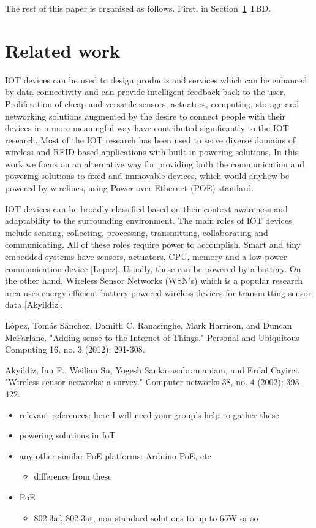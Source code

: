 \documentclass[draft,a4paper]{siamltex}
\begin{document}
The rest of this paper is organised as follows.  First, in
Section~\ref{sec:related} TBD.
 

\section{Related work}
\label{sec:related}

IOT devices can be used to design products and services which can be enhanced by
data connectivity and can provide intelligent feedback back to the user.
Proliferation of cheap and versatile sensors, actuators, computing, storage and
networking solutions augmented by the desire to connect people with their
devices in a more meaningful way have contributed significantly to the IOT
research. Most of the IOT research has been used to serve diverse domains of
wireless and RFID based applications with built-in powering solutions. In this
work we focus on an alternative way for providing both the communication and
powering solutions to fixed and immovable devices, which would anyhow be powered
by wirelines, using Power over Ethernet (POE) standard.

IOT devices can be broadly classified based on their context awareness and
adaptability to the surrounding environment. The main roles of IOT devices
include sensing, collecting, processing, transmitting, collaborating and
communicating. All of these roles require power to accomplish. Smart and tiny
embedded systems have sensors, actuators, CPU, memory and a low-power
communication device [Lopez]. Usually, these can be powered by a battery. On the
other hand, Wireless Sensor Networks (WSN's) which is a popular research area
uses energy efficient battery powered wireless devices for transmitting sensor
data [Akyildiz]. 

López, Tomás Sánchez, Damith C. Ranasinghe, Mark Harrison, and Duncan McFarlane.
"Adding sense to the Internet of Things." Personal and Ubiquitous Computing 16,
no. 3 (2012): 291-308.

Akyildiz, Ian F., Weilian Su, Yogesh Sankarasubramaniam, and Erdal Cayirci.
"Wireless sensor networks: a survey." Computer networks 38, no. 4 (2002):
393-422.

\begin{itemize}
  \item relevant references: here I will need your group's help to gather these
  \item powering solutions in IoT
  \item any other similar PoE platforms: Arduino PoE, etc
    \begin{itemize}
    \item difference from these
    \end{itemize}
  \item PoE
    \begin{itemize}
    \item 802.3af, 802.3at, non-standard solutions to up to 65W or so
    \end{itemize}
\end{itemize}
 
\end{document}
